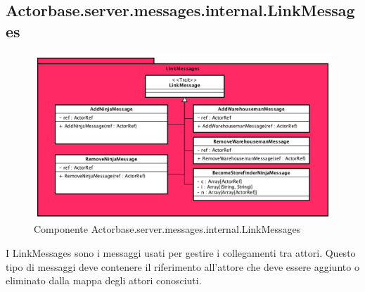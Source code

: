 \documentclass[a4paper]{article}
\begin{document}
	\subsection{Actorbase.server.messages.internal.LinkMessages}
				\begin{figure}[H]
			\centering
			\includegraphics[width=\textwidth]{Server/LinkMessages.png}
			\caption{Componente Actorbase.server.messages.internal.LinkMessages}
		\end{figure}
		I LinkMessages sono i messaggi usati per gestire i collegamenti tra attori. Questo tipo di messaggi deve contenere il riferimento all'attore che deve essere aggiunto o eliminato dalla mappa degli attori conosciuti. 
		
\end{document}
